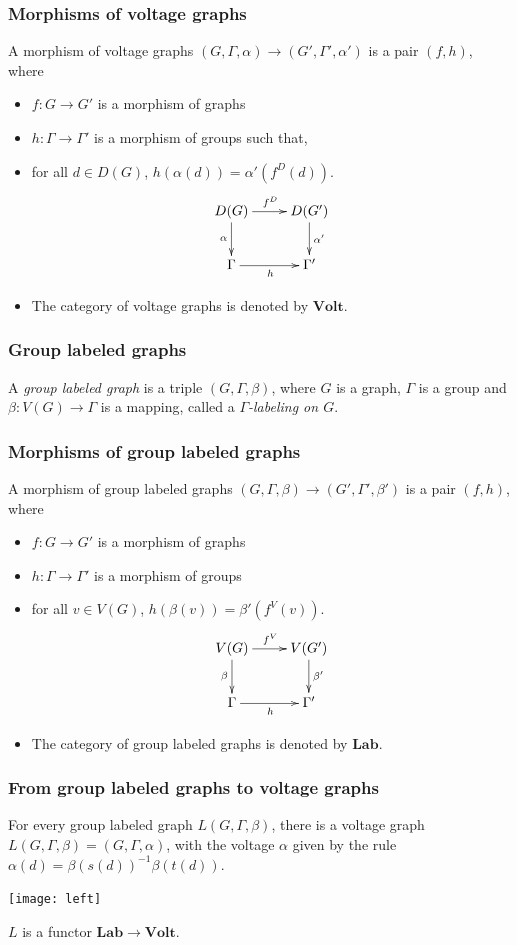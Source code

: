 \documentclass{beamer}
\newcommand{\Volt}{\mathbf{Volt}}
\newcommand{\Lab}{\mathbf{Lab}}
\begin{document}
\begin{frame}
\frametitle{Morphisms of voltage graphs}

A morphism of voltage graphs $(G,Γ,α)\to(G',Γ',α')$ is a pair $(f,h)$,
where 
\begin{itemize}
\item $f\colon G\to G'$ is a morphism of graphs
\item $h\colon Γ\to Γ'$ is a morphism of groups such that,
\item for all $d\in D(G)$, $h(α(d))=α'(f^D(d))$.
\[
\xymatrix{
D(G)
	\ar[r]^{f^D}
	\ar[d]_\alpha
&
D(G')
	\ar[d]^{\alpha'}
\\
\Gamma
	\ar[r]_h
&
\Gamma'
}
\]
\item The category of voltage graphs is denoted by $\Volt$.
\end{itemize}

\end{frame}
\begin{frame}
\frametitle{Group labeled graphs}

A {\em group labeled graph} 
is a triple $(G,Γ,β)$,
where $G$ is a graph, $Γ$ is a group and $β\colon V(G)\to Γ$ is a mapping, called a {\em $Γ$-labeling on
$G$}.

\end{frame}
\begin{frame}
\frametitle{Morphisms of group labeled graphs}
A morphism of group labeled graphs $(G,Γ,β)\to (G',Γ',β')$ is a
pair $(f,h)$, where 
\begin{itemize}
\item $f\colon G\to G'$ is a morphism of graphs
\item $h\colon Γ\to Γ'$ is a morphism of groups
\item for all $v\in V(G)$, $h(β(v))=β'(f^V(v))$.
\[
\xymatrix{
V(G)
	\ar[r]^{f^V}
	\ar[d]_\beta
&
V(G')
	\ar[d]^{\beta'}
\\
\Gamma
	\ar[r]_h
&
\Gamma'
}
\]
\item The category of group labeled graphs is denoted by $\Lab$.
\end{itemize}
\end{frame}
\begin{frame}
\frametitle{From group labeled graphs to voltage graphs}

For every group labeled graph $L(G,Γ,β)$, there is a voltage graph
$L(G,Γ,β)=(G,Γ,α)$, with the voltage $α$ given by the rule
$α(d)=β(s(d))^{-1}β(t(d))$.
\begin{center}
\texttt{[image: left]}
\end{center}
$L$ is a functor $\Lab\to\Volt$.
\end{frame}
\end{document}

